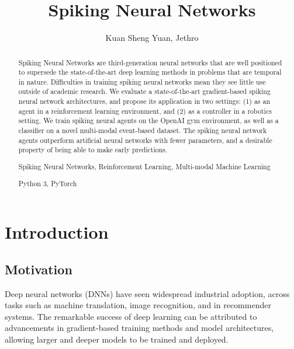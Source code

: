 \documentclass[fyp]{socreport}
\begin{document}
\author{Kuan Sheng Yuan, Jethro}
\title{Spiking Neural Networks}
\maketitle

\begin{abstract}
  Spiking Neural Networks are third-generation neural networks that are well
  positioned to supersede the state-of-the-art deep learning methods in problems
  that are temporal in nature. Difficulties in training spiking neural networks
  mean they see little use outside of academic research. We evaluate a
  state-of-the-art gradient-based spiking neural network architectures, and
  propose its application in two settings: (1) as an agent in a reinforcement
  learning environment, and (2) as a controller in a robotics setting. We train
  spiking neural agents on the OpenAI gym environment, as well as a classifier
  on a novel multi-modal event-based dataset. The spiking neural network agents
  outperform artificial neural networks with fewer parameters, and a desirable
  property of being able to make early predictions.

  \begin{keywords}
    Spiking Neural Networks, Reinforcement Learning, Multi-modal Machine Learning
  \end{keywords}

  \begin{implement} Python 3, PyTorch
  \end{implement}
\end{abstract}

\tableofcontents

\chapter{Introduction}

\section{Motivation}

Deep neural networks (DNNs) have seen widespread industrial adoption, across
tasks such as machine translation, image recognition, and in recommender
systems. The remarkable success of deep learning can be attributed to
advancements in gradient-based training methods and model architectures,
allowing larger and deeper models to be trained and deployed.
\end{document}
